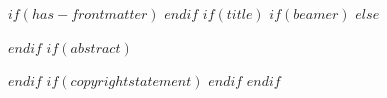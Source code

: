 $if(has-frontmatter)$
\frontmatter
$endif$
$if(title)$
$if(beamer)$
\frame{\titlepage}
$else$

\received{}
\pubdiscuss{} %
\revised{}
\accepted{}
\published{}



\maketitle
$endif$
$if(abstract)$
\begin{abstract}
$abstract$
\end{abstract}
$endif$
$if(copyrightstatement)$
$endif$
$endif$
